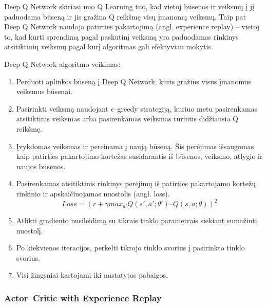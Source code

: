 \documentclass{VUMIFPSbakalaurinis}
\begin{document}
Deep Q Network skiriasi nuo Q Learning tuo, kad vietoj būsenos ir veiksmų į jį paduodama būseną ir jis gražina Q reikšmę visų įmanomų veiksmų. Taip pat Deep Q Network naudoja patirties pakartojimą (angl. experience replay) – vietoj to, kad kurti sprendimą pagal paskutinį veiksmą yra paduodamas rinkinys atsitiktinių veiksmų pagal kurį algoritmas gali efektyviau mokytis. 

Deep Q Network algoritmo veikimas\cite{handson}:
\begin{enumerate}
    \item Perduoti aplinkos būseną į Deep Q Network, kuris gražins visus įmanomus veiksmus būsenai.
    \item Pasirinkti veiksmą naudojant \(\epsilon\)–greedy strategiją, kuriuo metu pasirenkamas atsitiktinis veiksmas arba pasirenkamas veiksmas turintis didžiausia Q reikšmę.
    \item Įvykdomas veiksmas ir pereinama į naują būseną. Šis perėjimas išsaugomas kaip patirties pakartojimo kortežas susidarantis iš būsenos, veiksmo, atlygio ir naujos būsenos.
    \item Pasirenkamas atsitiktinis rinkinys perėjimų iš patirties pakartojamo kortežų rinkinio ir apskaičiuojamas nuostolis (angl. loss). \[Loss=(r + \gamma max_{a'} Q(s',a';\theta') – Q(s,a;\theta))^2\]
    \item Atlikti gradiento nusileidimą su tikrais tinklo parametrais siekiant sumažinti nuostolį.
    \item Po kiekvienos iteracijos, perkelti tikrojo tinklo svorius į pasirinkto tinklo svorius.
    \item Visi žingsniai kartojami iki nustatytos pabaigos.
\end{enumerate}

\subsubsection{Actor–Critic with Experience Replay}
\end{document}
